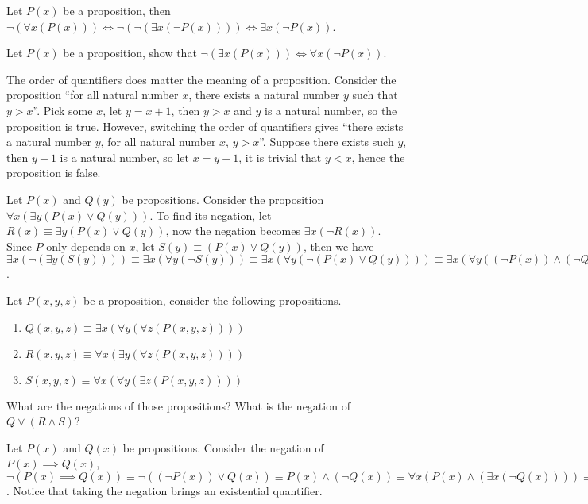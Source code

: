 \documentclass[10pt]{article}
\begin{document}
\begin{example}
    Let $P(x)$ be a proposition, then $\neg(\forall x(P(x)))\iff\neg(\neg(\exists x(\neg P(x))))\iff\exists x(\neg P(x))$. 
\end{example}
\begin{problem}
    Let $P(x)$ be a proposition, show that $\neg(\exists x(P(x)))\iff\forall x(\neg P(x))$.
\end{problem}
\par
The order of quantifiers does matter the meaning of a proposition. Consider the proposition ``for all natural number $x$, there exists a natural number $y$ such that $y>x$''. Pick some $x$, let $y=x+1$, then $y>x$ and $y$ is a natural number, so the proposition is true. However, switching the order of quantifiers gives ``there exists a natural number $y$, for all natural number $x$, $y>x$''. Suppose there exists such $y$, then $y+1$ is a natural number, so let $x=y+1$, it is trivial that $y<x$, hence the proposition is false.
\begin{example}
    Let $P(x)$ and $Q(y)$ be propositions. Consider the proposition $\forall x(\exists y(P(x)\vee Q(y)))$. To find its negation, let $R(x)\equiv\exists y(P(x)\vee Q(y))$, now the negation becomes $\exists x(\neg R(x))$. Since $P$ only depends on $x$, let $S(y)\equiv(P(x)\vee Q(y))$, then we have $\exists x(\neg(\exists y(S(y))))\equiv\exists x(\forall y(\neg S(y)))\equiv\exists x(\forall y(\neg(P(x)\vee Q(y))))\equiv\exists x(\forall y((\neg P(x))\wedge(\neg Q(y))))$.
\end{example}
\begin{problem}
    Let $P(x,y,z)$ be a proposition, consider the following propositions.
    \begin{enumerate}
        \item $Q(x,y,z)\equiv\exists x(\forall y(\forall z(P(x,y,z))))$
        \item $R(x,y,z)\equiv\forall x(\exists y(\forall z(P(x,y,z))))$
        \item $S(x,y,z)\equiv\forall x(\forall y(\exists z(P(x,y,z))))$
    \end{enumerate}
    What are the negations of those propositions? What is the negation of $Q\vee(R\wedge S)$?
\end{problem}
\begin{example}
    Let $P(x)$ and $Q(x)$ be propositions. Consider the negation of $P(x)\implies Q(x)$, $\neg(P(x)\implies Q(x))\equiv\neg((\neg P(x))\vee Q(x))\equiv P(x)\wedge(\neg Q(x))\equiv\forall x(P(x)\wedge(\exists x(\neg Q(x))))\equiv\exists x(P(x)\wedge(\neg Q(x)))$. Notice that taking the negation brings an existential quantifier.
\end{example}
\end{document}
